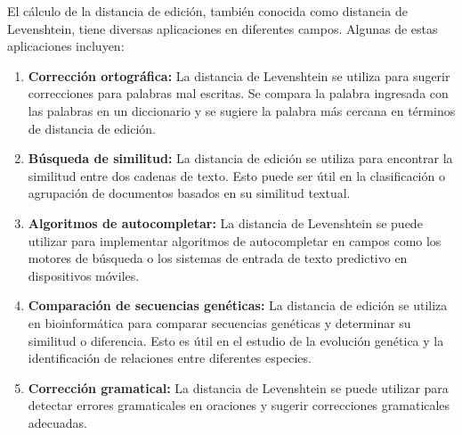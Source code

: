 El cálculo de la distancia de edición, también conocida como distancia de Levenshtein, tiene diversas aplicaciones en diferentes campos. Algunas de estas aplicaciones incluyen:

\begin{enumerate}
	\item \textbf{Corrección ortográfica:} La distancia de Levenshtein se utiliza para sugerir correcciones para palabras mal escritas. Se compara la palabra ingresada con las palabras en un diccionario y se sugiere la palabra más cercana en términos de distancia de edición.
	\item \textbf{Búsqueda de similitud:} La distancia de edición se utiliza para encontrar la similitud entre dos cadenas de texto. Esto puede ser útil en la clasificación o agrupación de documentos basados en su similitud textual.
	\item \textbf{Algoritmos de autocompletar:} La distancia de Levenshtein se puede utilizar para implementar algoritmos de autocompletar en campos como los motores de búsqueda o los sistemas de entrada de texto predictivo en dispositivos móviles.
	\item \textbf{Comparación de secuencias genéticas:} La distancia de edición se utiliza en bioinformática para comparar secuencias genéticas y determinar su similitud o diferencia. Esto es útil en el estudio de la evolución genética y la identificación de relaciones entre diferentes especies.
	\item \textbf{Corrección gramatical:} La distancia de Levenshtein se puede utilizar para detectar errores gramaticales en oraciones y sugerir correcciones gramaticales adecuadas.
\end{enumerate}